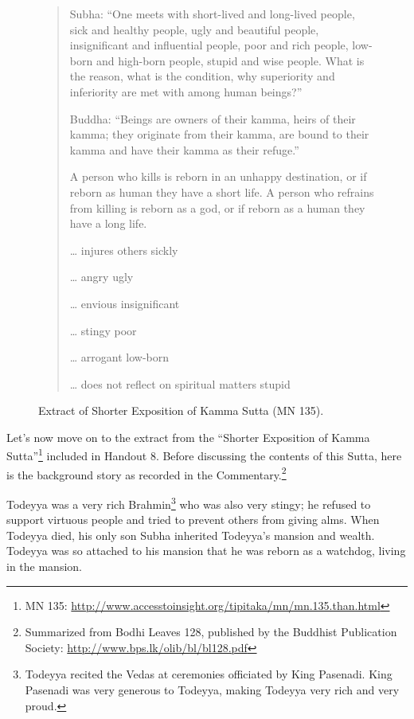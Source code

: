 \begin{figure}[H]
\begin{quotation}
Subha: “One meets with short-lived and long-lived people, sick and healthy people, ugly and beautiful people, insignificant and influential people, poor and rich people, low-born and high-born people, stupid and wise people. What is the reason, what is the condition, why superiority and inferiority are met with among human beings?”

Buddha: “Beings are owners of their kamma, heirs of their kamma; they originate from their kamma, are bound to their kamma and have their kamma as their refuge.”

A person who kills is reborn in an unhappy destination, or if reborn as human they have a short life. A person who refrains from killing is reborn as a god, or if reborn as a human they have a long life.

… injures others \textrightarrow \hspace{1mm} sickly

… angry \textrightarrow \hspace{1mm} ugly

… envious \textrightarrow \hspace{1mm} insignificant

… stingy \textrightarrow \hspace{1mm} poor

… arrogant \textrightarrow \hspace{1mm} low-born

… does not reflect on spiritual matters \textrightarrow \hspace{1mm} stupid
\end{quotation}
\caption{Extract of Shorter Exposition of Kamma Sutta (MN 135).}
\label{fig:MN135}
\end{figure}

Let’s now move on to the extract from the “Shorter Exposition of Kamma Sutta”\footnote{MN 135: \url{http://www.accesstoinsight.org/tipitaka/mn/mn.135.than.html}} included in Handout 8. Before discussing the contents of this Sutta, here is the background story as recorded in the Commentary.\footnote{Summarized from Bodhi Leaves 128, published by the Buddhist Publication Society: \url{http://www.bps.lk/olib/bl/bl128.pdf}}

Todeyya was a very rich Brahmin\footnote{Todeyya recited the Vedas at ceremonies officiated by King Pasenadi. King Pasenadi was very generous to Todeyya, making Todeyya very rich and very proud.} who was also very stingy; he refused to support virtuous people and tried to prevent others from giving alms. When Todeyya died, his only son Subha inherited Todeyya’s mansion and wealth. Todeyya was so attached to his mansion that he was reborn as a watchdog, living in the mansion.

